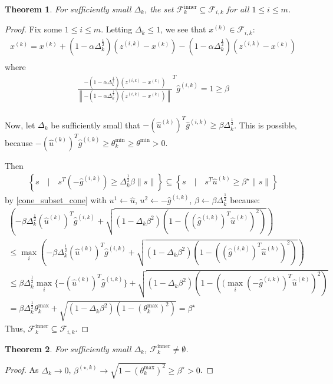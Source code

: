 \documentclass{article}
\newtheorem{theorem}{Theorem}[section]
\theoremstyle{case}
\newcommand{\dk}{\Delta_k}
\newcommand{\xk}{{x^{(k)}}}
\newcommand{\gik}{{g^{(i, k)}}}
\newcommand{\hgik}{{{\hat g}^{(i, k)}}}
\newcommand{\zik}{{z^{(i, k)}}}
\newcommand{\fik}{{\mathcal F_{i, k}}}
\newcommand{\huk}{{{\hat u}^{(k)}}}
\newcommand{\bsk}{{\beta^{(\star, k)}}}
\newcommand{\bs}{{\beta^{\star}}}
\newcommand{\fcki}{{\mathcal {F}^{\text{inner}}_k}}
\begin{document}
\begin{theorem}
For sufficiently small $\dk$, the set $\fcki \subseteq \fik$ for all $1\le i \le m$.
\end{theorem}


\begin{proof}
Fix some $1\le i \le m$.
Letting $\dk \le 1$, we see that $\xk \in \fik$:
\begin{align*}
\xk = \xk + \left(1 - \alpha\dk^{\frac 1 2}\right)(\zik - \xk) - \left(1 - \alpha\dk^{\frac 1 2}\right)(\zik - \xk) \\
\end{align*}
where
\begin{align*}
\frac{-\left(1 - \alpha\dk^{\frac 1 2}\right)(\zik - \xk)}{\left\|-\left(1 - \alpha\dk^{\frac 1 2}\right)(\zik - \xk)\right\|}^T\hgik = 1 \ge \beta\\
\end{align*}


Now, let $\dk$ be sufficiently small that $-(\huk)^T\hgik \ge \beta\dk^{\frac 1 2}$.
This is possible, because $ -(\huk)^T\hgik \ge \theta^{\text{min}}_k \ge \theta^{\text{min}} > 0$.

Then
\begin{align*}
\left\{s\quad | \quad s^T(-\hgik)\ge\dk^{\frac 1 2}\beta\|s\| \right\}  \subseteq \left\{s\quad | \quad s^T\huk\ge\beta^{\star}\|s\| \right\}
\end{align*}
by \cref{cone_subset_cone} with $u^1 \gets \hat u$, $u^2 \gets -\hgik$, $\beta \gets \beta \dk^{\frac 1 2 }$ because:
\begin{align*}
\left(-\beta\dk^{\frac 1 2}(\huk)^T\hgik + \sqrt{(1 - \dk\beta^2)\left(1 - \left((\hgik)^T\hat u^{(k)}\right)^2\right)}\right) \\
\le \max_i \left(-\beta\dk^{\frac 1 2}(\huk)^T{\hgik} + \sqrt{(1 - \dk\beta^2)\left(1 - \left((\hgik)^T\huk\right)^2\right)}\right) \\
\le \beta\dk^{\frac 1 2} \max_i\{-(\huk)^T\hgik\} + \sqrt{(1 - \dk\beta^2)\left(1 - \left((\max_i(-\hgik)^T\huk\right)^2\right)} \\
= \beta\dk^{\frac 1 2} \theta^{\text{max}}_k + \sqrt{(1 - \dk\beta^2)\left(1 - (\theta^{\text{max}}_k) ^2\right)} = \beta^{\star}
\end{align*}
Thus, $\fcki \subseteq \fik$.
\end{proof}

\begin{theorem}
For sufficiently small $\dk$, $\fcki \ne \emptyset$.
\end{theorem}
\begin{proof}
As $\dk \to 0$, $\bsk \to \sqrt{1 - (\theta^{\text{max}}_k) ^2} \ge \bs > 0$.
\end{proof}
\end{document}
